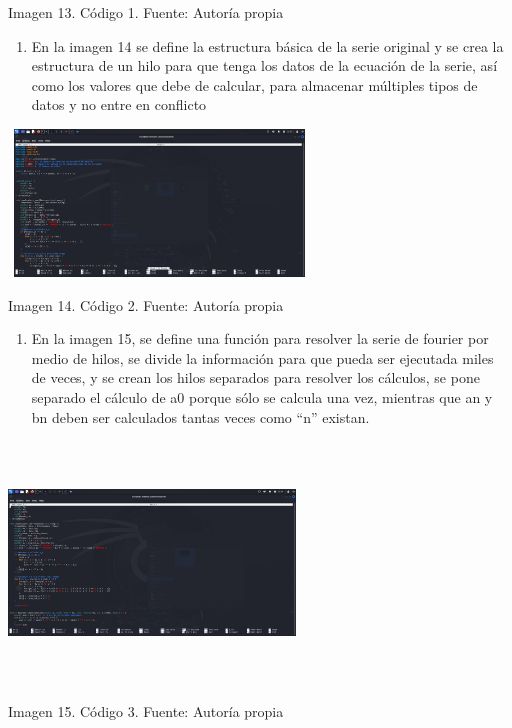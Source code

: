 Imagen 13. Código 1. Fuente: Autoría propia

\begin{enumerate} \def\labelenumi{\arabic{enumi}.} \setcounter{enumi}{1} \item   En la imagen 14 se define la estructura básica de la serie original y   se crea la estructura de un hilo para que tenga los datos de la   ecuación de la serie, así como los valores que debe de calcular, para   almacenar múltiples tipos de datos y no entre en conflicto \end{enumerate}

\includegraphics[width=3.15in,height=1.54172in]{media/image4.png}

Imagen 14. Código 2. Fuente: Autoría propia

\begin{enumerate} \def\labelenumi{\arabic{enumi}.} \setcounter{enumi}{2} \item   En la imagen 15, se define una función para resolver la serie de   fourier por medio de hilos, se divide la información para que pueda   ser ejecutada miles de veces, y se crean los hilos separados para   resolver los cálculos, se pone separado el cálculo de a0 porque sólo   se calcula una vez, mientras que an y bn deben ser calculados tantas   veces como ``n'' existan. \end{enumerate}

\includegraphics[width=3.00416in,height=2.52623in]{media/image17.png}

Imagen 15. Código 3. Fuente: Autoría propia

